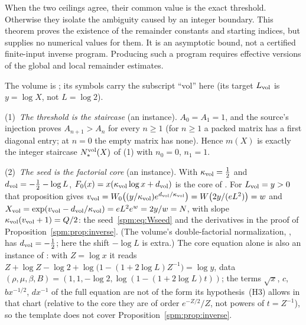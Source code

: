 When the two ceilings agree, their common value is the exact threshold. Otherwise they isolate the ambiguity caused by an integer boundary. This theorem proves the existence of the remainder constants and starting indices, but supplies no numerical values for them. It is an asymptotic bound, not a certified finite-input inverse program. Producing such a program requires effective versions of the global and local remainder estimates.

\begin{remark}\label{spm:rem:transseries}
The volume is
;
its symbols carry the subscript ``vol'' here (its target $L_{\rm vol}$ is
$y=\log X$, not $L=\log2$).

(1)~\emph{The threshold is the staircase} (an instance). $A_0=A_1=1$, and
the source's injection proves $A_{n+1}>A_n$ for every $n\ge1$ (for $n\ge1$
a packed matrix has a first diagonal entry; at $n=0$ the empty matrix has
none). Hence $m(X)$ is exactly the integer staircase $N_\ast^{\rm vol}(X)$
of (1) with $n_0=0$, $n_1=1$.

(2)~\emph{The seed is the factorial core} (an instance). With
$\kappa_{\rm vol}=\tfrac12$ and $d_{\rm vol}=-\tfrac12-\log L$,
$F_0(x)=x(\kappa_{\rm vol}\log x+d_{\rm vol})$ is the core of
. For $L_{\rm vol}=y>0$ that proposition gives
$v_{\rm vol}=W_0\bigl((y/\kappa_{\rm vol})e^{d_{\rm vol}/\kappa_{\rm vol}}\bigr)
=W\bigl(2y/(eL^2)\bigr)=w$ and
$X_{\rm vol}=\exp(v_{\rm vol}-d_{\rm vol}/\kappa_{\rm vol})=eL^2e^{w}=2y/w=N$,
with slope $\kappa_{\rm vol}(v_{\rm vol}+1)=Q/2$: the seed~\eqref{spm:eq:Wseed}
and the derivatives in the proof of Proposition~\ref{spm:prop:inverse}. (The
volume's double-factorial normalization, , has
$d_{\rm vol}=-\tfrac12$; here the shift $-\log L$ is extra.) The core
equation alone is also an instance of : with
$Z=\log x$ it reads $Z+\log Z-\log2+\log\bigl(1-(1+2\log L)Z^{-1}\bigr)=\log y$,
data $(\rho,\mu,\beta,B)=(1,1,-\log2,\log(1-(1+2\log L)t))$; the terms
$\sqrt x$, $c$, $bx^{-1/2}$, $dx^{-1}$ of the full equation are not of the
form its hypothesis~(H3) allows in that chart (relative to the core they
are of order $e^{-Z/2}/Z$, not powers of $t=Z^{-1}$), so the template does
not cover Proposition~\ref{spm:prop:inverse}.


\end{remark}
